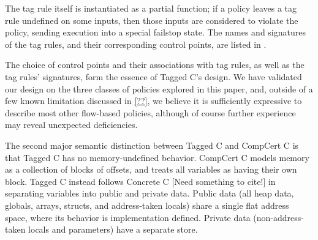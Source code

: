 \documentclass{llncs}
\begin{document}
{\begin{minipage}[t]{0.37\textwidth}
  \binopsteptagless
\end{minipage}
\begin{minipage}[t]{0.6\textwidth}
  \binopstep
\end{minipage}

The tag rule itself is instantiated as a partial function; if a policy leaves a tag rule
undefined on some inputs, then those inputs are considered to violate the policy, sending
execution into a special failstop state. The names and signatures of the tag rules,
and their corresponding control points, are listed in .

The choice of control points and their associations with tag rules, as well as the tag rules'
signatures, form the essence of Tagged C's design. 
We have validated our design on the three classes of policies explored in this paper,
and, outside of a few known limitation discussed in \ref{??},
we believe it is sufficiently expressive to describe most other flow-based policies, although
of course further experience may reveal unexpected deficiencies. 

The second major semantic distinction between Tagged C and CompCert C is that Tagged C has no
memory-undefined behavior. CompCert C models memory as a collection of blocks of offsets,
and treats all variables as having their own block. Tagged C instead follows Concrete C
\cite{} [Need something to cite!] in separating variables into public and private data.
Public data (all heap data, globals, arrays, structs, and address-taken locals) share a single flat address
space, where its behavior is implementation defined. 
Private data (non-address-taken locals and parameters) have a separate store.


}
\end{document}
